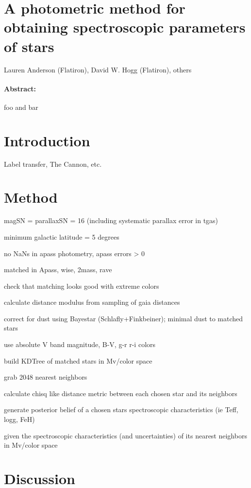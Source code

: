 \documentclass[11pt,letterpaper]{article}
\begin{document}
\section*{A photometric method for obtaining spectroscopic parameters of stars}

\noindent
Lauren Anderson (Flatiron), David W. Hogg (Flatiron), others

\paragraph{Abstract:}
foo and bar

\section{Introduction}

Label transfer, The Cannon, etc.

\section{Method}

magSN = parallaxSN = 16 (including systematic parallax error in tgas)

minimum galactic latitude = 5 degrees

no NaNs in apass photometry, apass errors > 0

matched in Apass, wise, 2mass, rave

check that matching looks good with extreme colors

calculate distance modulus from sampling of gaia distances

correct for dust using Bayestar (Schlafly+Finkbeiner); minimal dust to matched stars

use absolute V band magnitude, B-V, g-r r-i colors

build KDTree of matched stars in Mv/color space

grab 2048 nearest neighbors

calculate chisq like distance metric between each chosen star and its neighbors

generate posterior belief of a chosen stars spectroscopic characteristics (ie Teff, logg, FeH)

given the spectroscopic characteristics (and uncertainties) of its nearest neighbors in Mv/color space

\section{Discussion}
\end{document}
